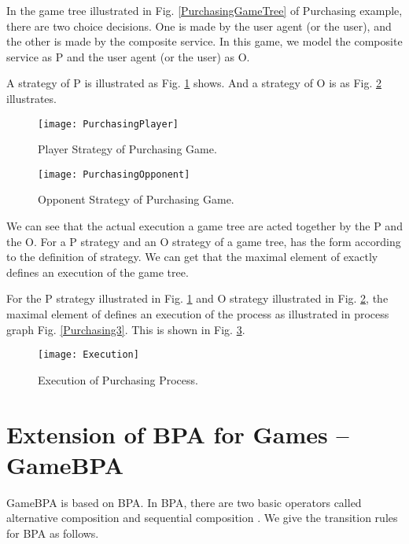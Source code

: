 \documentclass{fac}
\begin{document}
In the game tree illustrated in Fig. \ref{PurchasingGameTree} of Purchasing example, there are two choice decisions. One is made by the user agent (or the user), and the other is made by the composite service. In this game, we model the composite service as P and the user agent (or the user) as O.

A strategy of P is illustrated as Fig. \ref{PurchasingPlayer} shows. And a strategy of O is as Fig. \ref{PurchasingOpponent} illustrates.

\begin{figure}
  \centering
\texttt{[image: PurchasingPlayer]}
  \caption{Player Strategy of Purchasing Game.}
  \label{PurchasingPlayer}
\end{figure}

\begin{figure}
  \centering
\texttt{[image: PurchasingOpponent]}
  \caption{Opponent Strategy of Purchasing Game.}
  \label{PurchasingOpponent}
\end{figure}

We can see that the actual execution a game tree are acted together by the P and the O. For a P strategy  and an O strategy  of a game tree,  has the form  according to the definition of strategy. We can get that the maximal element  of  exactly defines an execution of the game tree.

For the P strategy  illustrated in Fig. \ref{PurchasingPlayer} and O strategy  illustrated in Fig. \ref{PurchasingOpponent}, the maximal element  of  defines an execution of the process as illustrated in process graph Fig. \ref{Purchasing3}. This is shown in Fig. \ref{Execution}.

\begin{figure}
  \centering
\texttt{[image: Execution]}
  \caption{Execution of Purchasing Process.}
  \label{Execution}
\end{figure}

\section{Extension of BPA for Games -- GameBPA}\label{extension}
GameBPA is based on BPA. In BPA, there are two basic operators called alternative composition  and sequential composition . We give the transition rules for BPA as follows.
\end{document}
